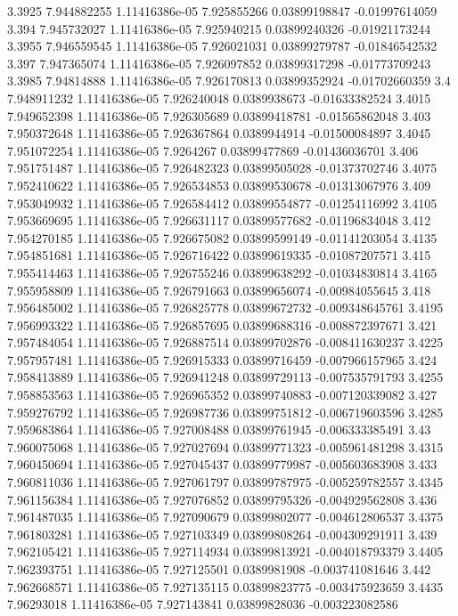 {3.3925 7.944882255 1.11416386e-05 7.925855266 0.03899198847 -0.01997614059
3.394 7.945732027 1.11416386e-05 7.925940215 0.03899240326 -0.01921173244
3.3955 7.946559545 1.11416386e-05 7.926021031 0.03899279787 -0.01846542532
3.397 7.947365074 1.11416386e-05 7.926097852 0.03899317298 -0.01773709243
3.3985 7.94814888 1.11416386e-05 7.926170813 0.03899352924 -0.01702660359
3.4 7.948911232 1.11416386e-05 7.926240048 0.0389938673 -0.01633382524
3.4015 7.949652398 1.11416386e-05 7.926305689 0.03899418781 -0.01565862048
3.403 7.950372648 1.11416386e-05 7.926367864 0.0389944914 -0.01500084897
3.4045 7.951072254 1.11416386e-05 7.9264267 0.03899477869 -0.01436036701
3.406 7.951751487 1.11416386e-05 7.926482323 0.03899505028 -0.01373702746
3.4075 7.952410622 1.11416386e-05 7.926534853 0.03899530678 -0.01313067976
3.409 7.953049932 1.11416386e-05 7.926584412 0.03899554877 -0.01254116992
3.4105 7.953669695 1.11416386e-05 7.926631117 0.03899577682 -0.01196834048
3.412 7.954270185 1.11416386e-05 7.926675082 0.03899599149 -0.01141203054
3.4135 7.954851681 1.11416386e-05 7.926716422 0.03899619335 -0.01087207571
3.415 7.955414463 1.11416386e-05 7.926755246 0.03899638292 -0.01034830814
3.4165 7.955958809 1.11416386e-05 7.926791663 0.03899656074 -0.00984055645
3.418 7.956485002 1.11416386e-05 7.926825778 0.03899672732 -0.009348645761
3.4195 7.956993322 1.11416386e-05 7.926857695 0.03899688316 -0.008872397671
3.421 7.957484054 1.11416386e-05 7.926887514 0.03899702876 -0.008411630237
3.4225 7.957957481 1.11416386e-05 7.926915333 0.03899716459 -0.007966157965
3.424 7.958413889 1.11416386e-05 7.926941248 0.03899729113 -0.007535791793
3.4255 7.958853563 1.11416386e-05 7.926965352 0.03899740883 -0.007120339082
3.427 7.959276792 1.11416386e-05 7.926987736 0.03899751812 -0.006719603596
3.4285 7.959683864 1.11416386e-05 7.927008488 0.03899761945 -0.006333385491
3.43 7.960075068 1.11416386e-05 7.927027694 0.03899771323 -0.005961481298
3.4315 7.960450694 1.11416386e-05 7.927045437 0.03899779987 -0.005603683908
3.433 7.960811036 1.11416386e-05 7.927061797 0.03899787975 -0.005259782557
3.4345 7.961156384 1.11416386e-05 7.927076852 0.03899795326 -0.004929562808
3.436 7.961487035 1.11416386e-05 7.927090679 0.03899802077 -0.004612806537
3.4375 7.961803281 1.11416386e-05 7.927103349 0.03899808264 -0.004309291911
3.439 7.962105421 1.11416386e-05 7.927114934 0.03899813921 -0.004018793379
3.4405 7.962393751 1.11416386e-05 7.927125501 0.0389981908 -0.003741081646
3.442 7.962668571 1.11416386e-05 7.927135115 0.03899823775 -0.003475923659
3.4435 7.96293018 1.11416386e-05 7.927143841 0.03899828036 -0.003223082586
}
